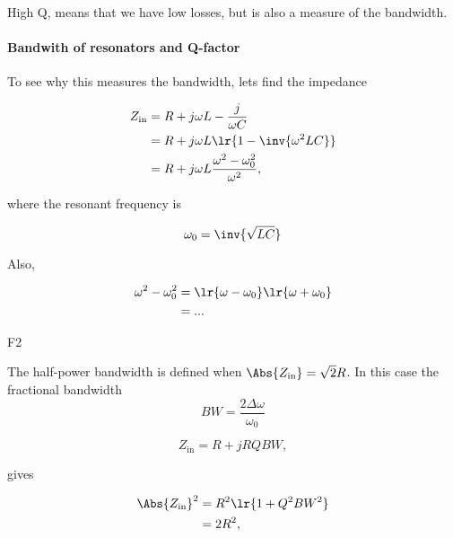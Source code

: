 High Q, means that we have low losses, but is also a measure of the bandwidth.

\paragraph{Bandwith of resonators and Q-factor}

To see why this measures the bandwidth, lets find the impedance

\begin{equation}\label{eqn:uwavesDeck8ResonatorQfactorCore:160}
\begin{aligned}
Z_{\textrm{in}}
&= R + j \omega L - \frac{j}{\omega C}
\\ &= R + j \omega L \lr{ 1 - \inv{\omega^2 L C} }
\\ &= R + j \omega L \frac{\omega^2 - \omega_0^2}{\omega^2},
\end{aligned}
\end{equation}

where the resonant frequency is

\begin{equation}\label{eqn:uwavesDeck8ResonatorQfactorCore:180}
\omega_0 = \inv{\sqrt{LC}}
\end{equation}

Also,

\begin{equation}\label{eqn:uwavesDeck8ResonatorQfactorCore:200}
\begin{aligned}
\omega^2 - \omega_0^2 &= \lr{ \omega - \omega_0 }\lr{ \omega + \omega_0 }
\\ &=
...
\end{aligned}
\end{equation}

F2

The half-power bandwidth is defined when \( \Abs{Z_{\textrm{in}}} = \sqrt{2} R \).  In this case the fractional bandwidth
\begin{equation}\label{eqn:uwavesDeck8ResonatorQfactorCore:220}
BW = \frac{2 \Delta \omega}{\omega_0}
\end{equation}

\begin{equation}\label{eqn:uwavesDeck8ResonatorQfactorCore:240}
Z_{\textrm{in}} = R + j R Q BW,
\end{equation}

gives

\begin{equation}\label{eqn:uwavesDeck8ResonatorQfactorCore:260}
\begin{aligned}
\Abs{Z_{\textrm{in}}}^2 &= R^2\lr{ 1 + Q^2 BW^2 } \\ &= 2 R^2,
\end{aligned}
\end{equation}

